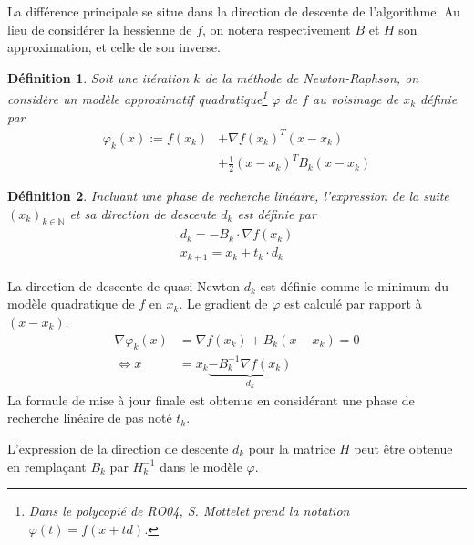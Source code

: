 \documentclass[3p, twocolumn]{elsarticle}
\newtheorem{definition}{Définition}[section]
\begin{document}
La différence principale se situe dans la direction de descente de l'algorithme. Au lieu de considérer la hessienne de $f$, on notera respectivement $B$ et $H$ son approximation, et celle de son inverse.

\begin{definition}
    Soit une itération $k$ de la méthode de Newton-Raphson, on considère un modèle approximatif quadratique\footnote{Dans le polycopié de RO04, S. Mottelet \cite{poly:mottelet2003} prend la notation $\varphi(t) = f(x+td)$.} $\varphi$ de $f$ au voisinage de $x_{k}$ définie par
    \begin{align}
        \varphi_k(x) := f(x_k) &+ \nabla f(x_k)^T (x - x_k)\nonumber\\ 
        &+ \frac12 (x-x_k)^T B_k (x-x_k)
        \label{eq:modele-quad-qn}
    \end{align}
\end{definition}

\begin{definition}
    Incluant une phase de recherche linéaire, l'expression de la suite $(x_k)_{k\in \mathbb{N}}$ et sa direction de descente $d_k$ est définie par 
    \begin{align}
        d_k = -B_k\cdot \nabla f(x_k)\nonumber \\
        x_{k+1} = x_k + t_k\cdot d_k
        \label{eq:suite-qn}
    \end{align}
\end{definition}

\begin{pf}
    La direction de descente de quasi-Newton $d_k$ est définie comme le minimum du modèle quadratique de $f$ en $x_k$. Le gradient de $\varphi$ est calculé par rapport à $(x - x_k)$. 
    \begin{align*}
        \nabla \varphi_k(x)&=\nabla f(x_k) + B_k(x-x_k) = 0\\
        \iff x &= x_k \underbrace{- B_k^{-1}\nabla f(x_k)}_{d_k} 
    \end{align*}
    La formule de mise à jour finale est obtenue en considérant une phase de recherche linéaire de pas noté $t_k$.
\end{pf}

\begin{rmk}
    L'expression de la direction de descente $d_k$ pour la matrice $H$ peut être obtenue en remplaçant $B_k$ par $H_k^{-1}$ dans le modèle $\varphi$.
\end{rmk}
\end{document}
